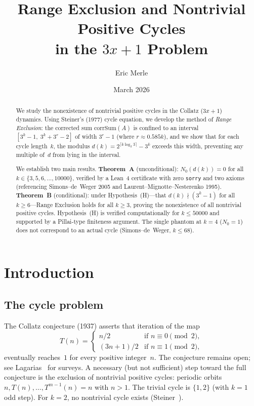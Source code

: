 \documentclass[11pt, a4paper]{amsart}
\title[Range Exclusion for Collatz cycles]{%
  Range Exclusion and Nontrivial Positive Cycles\\
  in the $3x{+}1$ Problem}
\author{Eric Merle}
\date{March 2026}
\theoremstyle{plain}
\theoremstyle{definition}
\theoremstyle{remark}
\newcommand{\corrSum}{\mathrm{corrSum}}
\begin{document}
\begin{abstract}
We study the nonexistence of nontrivial positive cycles in the Collatz
($3x{+}1$) dynamics.  Using Steiner's (1977) cycle equation, we
develop the method of \emph{Range Exclusion}: the corrected sum
$\corrSum(A)$ is confined to an interval
$[3^k - 1,\; 3^k + 3^r - 2]$ of width $3^r - 1$
(where $r \approx 0.585k$), and we show that for each cycle
length~$k$, the modulus $d(k) = 2^{\lceil k\log_2 3\rceil} - 3^k$
exceeds this width, preventing any multiple of~$d$ from lying in
the interval.

We establish two main results.
\textbf{Theorem~A} (unconditional): $N_0(d(k)) = 0$
for all $k \in \{3, 5, 6, \ldots, 10000\}$,
verified by a Lean~4 certificate with zero \texttt{sorry} and
two axioms (referencing Simons--de~Weger 2005 and
Laurent--Mignotte--Nesterenko 1995).
\textbf{Theorem~B} (conditional):
under Hypothesis~(H)---that $d(k) \nmid (3^k - 1)$ for all
$k \geq 6$---Range Exclusion holds for all $k \geq 3$, proving
the nonexistence of all nontrivial positive cycles.
Hypothesis~(H) is verified computationally for $k \leq 50000$
and supported by a Pillai-type finiteness argument.
The single phantom at $k = 4$ ($N_0 = 1$) does not correspond
to an actual cycle (Simons--de~Weger, $k \leq 68$).
\end{abstract}

\maketitle
\tableofcontents

\section{Introduction}\label{sec:intro}

\subsection{The cycle problem}\label{ssec:cycle-problem}

The Collatz conjecture (1937) asserts that iteration of the map
\begin{equation}\label{eq:collatz}
  T(n) = \begin{cases}
    n/2       & \text{if } n \equiv 0 \pmod{2}, \\
    (3n+1)/2  & \text{if } n \equiv 1 \pmod{2},
  \end{cases}
\end{equation}
eventually reaches~$1$ for every positive integer~$n$.
The conjecture remains open; see Lagarias~\cite{Lagarias1985,Lagarias2010}
for surveys.  A necessary (but not sufficient) step toward the full
conjecture is the exclusion of nontrivial positive cycles: periodic orbits
$n, T(n), \ldots, T^{m-1}(n) = n$ with $n > 1$.  The trivial cycle
is $\{1, 2\}$ (with $k = 1$ odd step).  For $k = 2$, no nontrivial
cycle exists (Steiner~\cite{Steiner1977}).
\end{document}
